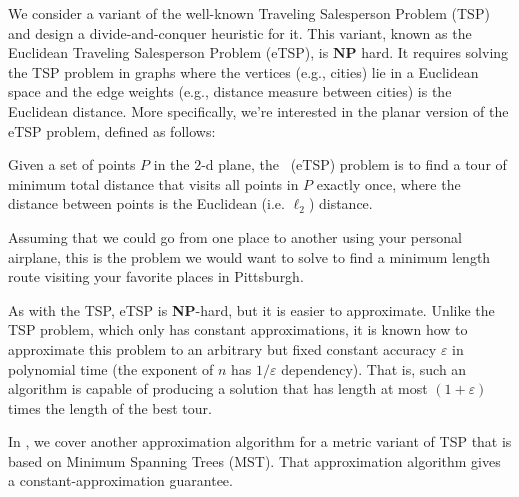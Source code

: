 \begin{gram}
We consider a variant of the  well-known Traveling Salesperson Problem (TSP) and design a divide-and-conquer heuristic for it.
%
%
This variant, known as the Euclidean Traveling Salesperson Problem
(eTSP), is $\textbf{NP}$ hard.
%
It requires solving the TSP problem in graphs where the vertices
(e.g., cities) lie in a Euclidean space and the edge weights (e.g.,
distance measure between cities) is the Euclidean distance.  More
specifically, we're interested in the planar version of the eTSP
problem, defined as follows:
\end{gram}

\begin{definition}
  Given a set of points $P$ in the $2$-d plane, the~ (eTSP) problem is to find a tour of minimum total
  distance that visits all points in $P$ exactly once, where the distance
  between points is the Euclidean (i.e. $\ell_2$) distance.
\end{definition}

\begin{example}
Assuming that we could go from one place to another using your
personal airplane, this is the problem we would want to solve to find
a minimum length route visiting your favorite places in Pittsburgh.
\end{example}

\begin{gram}
%
As with the TSP, eTSP is \textbf{NP}-hard, but it is easier to
approximate.
%
Unlike the TSP problem, which only has constant approximations, it is
known how to approximate this problem to an arbitrary but fixed
constant accuracy $\varepsilon$ in polynomial time (the exponent of
$n$ has $1/\varepsilon$ dependency).
%
That is, such an algorithm is capable of producing a solution that has
length at most $(1+\varepsilon)$ times the length of the best tour.
%

\end{gram}

\begin{note}
In , we cover another approximation algorithm for a
metric variant of TSP that is based on Minimum Spanning Trees (MST).
That approximation algorithm gives a constant-approximation guarantee.
\end{note}

